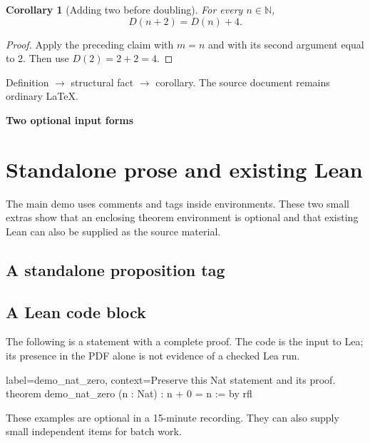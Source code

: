 \documentclass[11pt]{article}
\newtheorem{corollary}[definition]{Corollary}
\newcommand{\demotitle}[2]{%
  \noindent{\small\color{leagreen}\sffamily\bfseries #1}\par
  \vspace{0.3em}
  {\LARGE\sffamily\bfseries #2}\par
  \vspace{0.8em}}
\begin{document}
\begin{corollary}[Adding two before doubling]\label{cor:demo-double-two}
For every $n\in\mathbb{N}$,
\[
  D(n+2)=D(n)+4.
\]
\end{corollary}
\begin{proof}
Apply the preceding claim with $m=n$ and with its second argument equal
to $2$. Then use $D(2)=2+2=4$.
\end{proof}

\vfill
{\small\color{leagreen}Definition $\longrightarrow$ structural fact
$\longrightarrow$ corollary. The source document remains ordinary LaTeX.}
\clearpage

\clearpage

\clearpage
\demotitle{LEA DEMO / 04}{Two optional input forms}
\section{Standalone prose and existing Lean}

The main demo uses comments and tags inside environments. These two
small extras show that an enclosing theorem environment is optional and
that existing Lean can also be supplied as the source material.

\subsection{A standalone proposition tag}

\subsection{A Lean code block}
The following is a statement with a complete proof. The code is the input
to Lea; its presence in the PDF alone is not evidence of a checked Lea run.

\begin{leacode}{label=demo_nat_zero, context={Preserve this Nat statement and its proof.}}
theorem demo_nat_zero (n : Nat) : n + 0 = n := by
  rfl
\end{leacode}

\vfill
{\small\color{leagreen}These examples are optional in a 15-minute
recording. They can also supply small independent items for batch work.}
\end{document}
